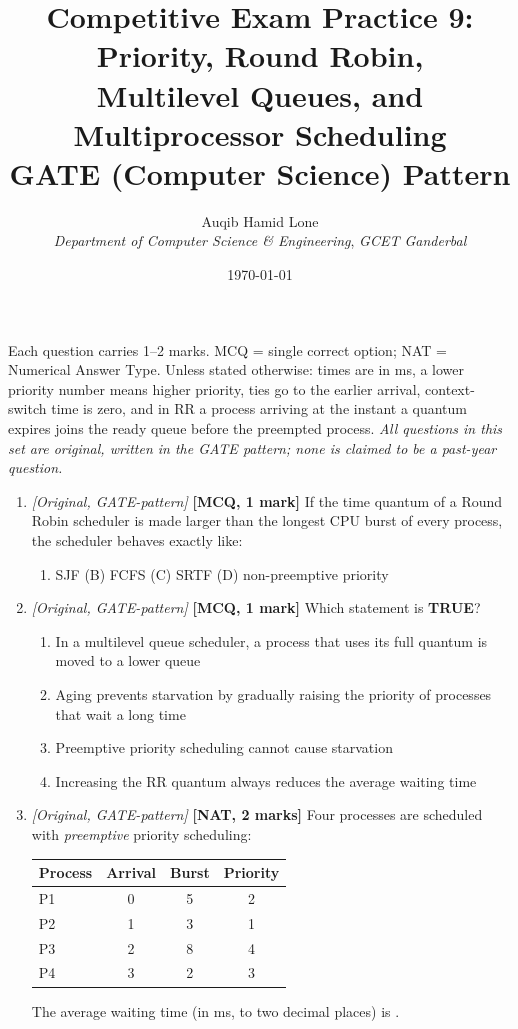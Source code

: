 \documentclass[11pt]{article}
\title{Competitive Exam Practice 9: Priority, Round Robin,\\Multilevel Queues, and Multiprocessor Scheduling\\\large GATE (Computer Science) Pattern}
\author{Auqib Hamid Lone\\[0.3em]
  \emph{Department of Computer Science \& Engineering}, \emph{GCET Ganderbal}}
\date{\today}
\begin{document}
\maketitle

\noindent Each question carries 1--2 marks. MCQ = single correct option; NAT = Numerical Answer Type. Unless stated otherwise: times are in ms, a lower priority number means higher priority, ties go to the earlier arrival, context-switch time is zero, and in RR a process arriving at the instant a quantum expires joins the ready queue before the preempted process. \emph{All questions in this set are original, written in the GATE pattern; none is claimed to be a past-year question.}

\begin{enumerate}
\item[\textbf{Q1}] \textit{[Original, GATE-pattern]} \textbf{[MCQ, 1 mark]} If the time quantum of a Round Robin scheduler is made larger than the longest CPU burst of every process, the scheduler behaves exactly like:
\begin{enumerate}
  \item[(A)] SJF \quad (B) FCFS \quad (C) SRTF \quad (D) non-preemptive priority
\end{enumerate}

\item[\textbf{Q2}] \textit{[Original, GATE-pattern]} \textbf{[MCQ, 1 mark]} Which statement is \textbf{TRUE}?
\begin{enumerate}
  \item[(A)] In a multilevel queue scheduler, a process that uses its full quantum is moved to a lower queue
  \item[(B)] Aging prevents starvation by gradually raising the priority of processes that wait a long time
  \item[(C)] Preemptive priority scheduling cannot cause starvation
  \item[(D)] Increasing the RR quantum always reduces the average waiting time
\end{enumerate}

\item[\textbf{Q3}] \textit{[Original, GATE-pattern]} \textbf{[NAT, 2 marks]} Four processes are scheduled with \emph{preemptive} priority scheduling:
\begin{center}
\begin{tabular}{lccc}
Process & Arrival & Burst & Priority\\ \hline
P1 & 0 & 5 & 2\\ P2 & 1 & 3 & 1\\ P3 & 2 & 8 & 4\\ P4 & 3 & 2 & 3\\
\end{tabular}
\end{center}
The average waiting time (in ms, to two decimal places) is \underline{\hspace{2cm}}.


\end{enumerate}
\end{document}
